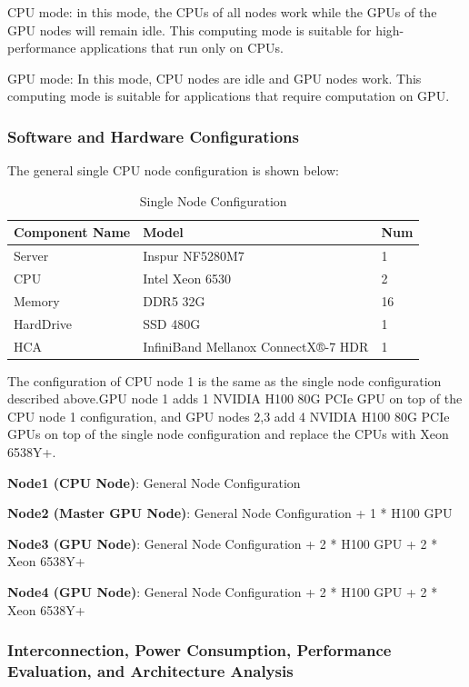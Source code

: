 \documentclass[a4paper,12pt]{article}
\begin{document}
CPU mode: in this mode, the CPUs of all nodes work while the GPUs of the GPU nodes will remain idle. This computing mode is suitable for high-performance applications that run only on CPUs.

GPU mode: In this mode, CPU nodes are idle and GPU nodes work. This computing mode is suitable for applications that require computation on GPU.

\subsubsection{Software and Hardware Configurations}

The general single CPU node configuration is shown below:
\begin{table}[H]
\centering
\caption{Single Node Configuration}
\vspace{0.5cm}
\begin{tabular}{|l|l|l|}
\toprule
Component Name & Model & Num \\
\midrule
Server & Inspur NF5280M7 & 1 \\
\hline
CPU & Intel Xeon 6530 & 2 \\
\hline
Memory & DDR5 32G & 16 \\
\hline
HardDrive & SSD 480G & 1 \\
\hline
HCA & InfiniBand Mellanox ConnectX®-7 HDR & 1 \\
\bottomrule
\end{tabular}
\end{table}

The configuration of CPU node 1 is the same as the single node configuration described above.GPU node 1 adds 1 NVIDIA H100 80G PCIe GPU on top of the CPU node 1 configuration, and GPU nodes 2,3 add 4 NVIDIA H100 80G PCIe GPUs on top of the single node configuration and replace the CPUs with Xeon 6538Y+.

\textbf{Node1 (CPU Node)}: General Node Configuration

\textbf{Node2 (Master GPU Node)}: General Node Configuration + 1 * H100 GPU

\textbf{Node3 (GPU Node)}: General Node Configuration + 2 * H100 GPU + 2 * Xeon 6538Y+

\textbf{Node4 (GPU Node)}: General Node Configuration + 2 * H100 GPU + 2 * Xeon 6538Y+

\subsubsection{Interconnection, Power Consumption, Performance Evaluation, and Architecture Analysis}
\end{document}
